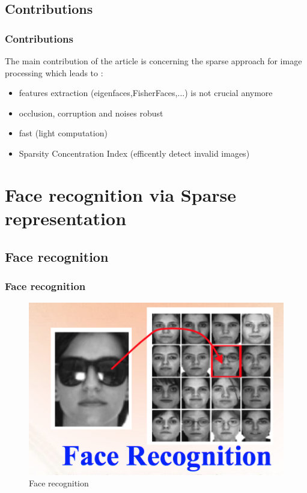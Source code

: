 \documentclass{beamer}
\begin{document}
			
	\subsection{Contributions}

	
	\begin{frame}
		\frametitle{Contributions}	
		

The main contribution of the article is concerning the sparse approach for image processing which leads to :
 	\begin{itemize}	
 	\item features extraction (eigenfaces,FisherFaces,...) is not crucial anymore 
 	\item occlusion, corruption and noises robust
 	\item fast (light computation)
 	\item Sparsity Concentration Index (efficently detect invalid images)	
	\end{itemize}
	
	\end{frame}
	


\section{Face recognition via Sparse representation}

	\subsection{Face recognition}
	
	
\begin{frame}
\frametitle{Face recognition}
			\begin{figure}[!ht]
			\begin{center}
			\includegraphics[scale=0.7]{face_recog.png}
			\end{center}
			\caption{Face recognition}
			\label{fa}
			\end{figure}
\end{frame}
\end{document}
